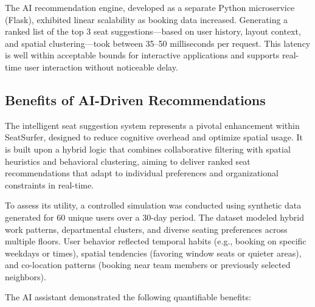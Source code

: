 \documentclass[onecolumn, 12pt]{IEEEtran}
\begin{document}
The AI recommendation engine, developed as a separate Python microservice (Flask), exhibited linear scalability as booking data increased. Generating a ranked list of the top 3 seat suggestions—based on user history, layout context, and spatial clustering—took between 35--50 milliseconds per request. This latency is well within acceptable bounds for interactive applications and supports real-time user interaction without noticeable delay.

\subsection{Benefits of AI-Driven Recommendations}

The intelligent seat suggestion system represents a pivotal enhancement within SeatSurfer, designed to reduce cognitive overhead and optimize spatial usage. It is built upon a hybrid logic that combines collaborative filtering with spatial heuristics and behavioral clustering, aiming to deliver ranked seat recommendations that adapt to individual preferences and organizational constraints in real-time.

To assess its utility, a controlled simulation was conducted using synthetic data generated for 60 unique users over a 30-day period. The dataset modeled hybrid work patterns, departmental clusters, and diverse seating preferences across multiple floors. User behavior reflected temporal habits (e.g., booking on specific weekdays or times), spatial tendencies (favoring window seats or quieter areas), and co-location patterns (booking near team members or previously selected neighbors).

The AI assistant demonstrated the following quantifiable benefits:
\end{document}
